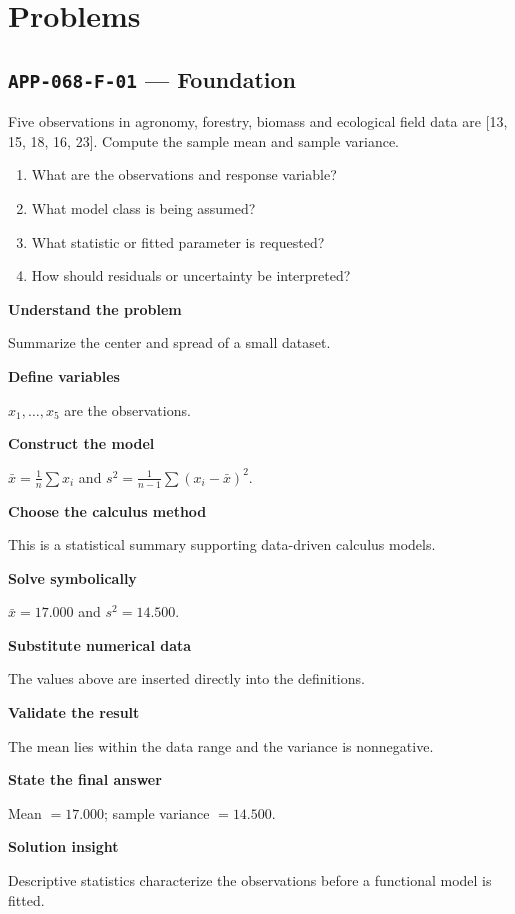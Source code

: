 \documentclass[11pt]{book}
\newcommand{\pid}[1]{\texttt{#1}}
\begin{document}
\section*{Problems}
\subsection*{\pid{APP-068-F-01} — Foundation}
\begin{problembox}
Five observations in agronomy, forestry, biomass and ecological field data are [13, 15, 18, 16, 23]. Compute the sample mean and sample variance.
\end{problembox}
\begin{promptbox}\begin{enumerate}
\item What are the observations and response variable?
\item What model class is being assumed?
\item What statistic or fitted parameter is requested?
\item How should residuals or uncertainty be interpreted?
\end{enumerate}\end{promptbox}
\begin{solutionbox}
\textbf{Understand the problem}\par Summarize the center and spread of a small dataset.\par\medskip
\textbf{Define variables}\par $x_1,\dots,x_5$ are the observations.\par\medskip
\textbf{Construct the model}\par $\bar x=\frac1n\sum x_i$ and $s^2=\frac1{n-1}\sum(x_i-\bar x)^2$.\par\medskip
\textbf{Choose the calculus method}\par This is a statistical summary supporting data-driven calculus models.\par\medskip
\textbf{Solve symbolically}\par $\bar x=17.000$ and $s^2=14.500$.\par\medskip
\textbf{Substitute numerical data}\par The values above are inserted directly into the definitions.\par\medskip
\textbf{Validate the result}\par The mean lies within the data range and the variance is nonnegative.\par\medskip
\textbf{State the final answer}\par Mean $=17.000$; sample variance $=14.500$.\par\medskip
\textbf{Solution insight}\par Descriptive statistics characterize the observations before a functional model is fitted.\par\medskip
\end{solutionbox}
\end{document}
